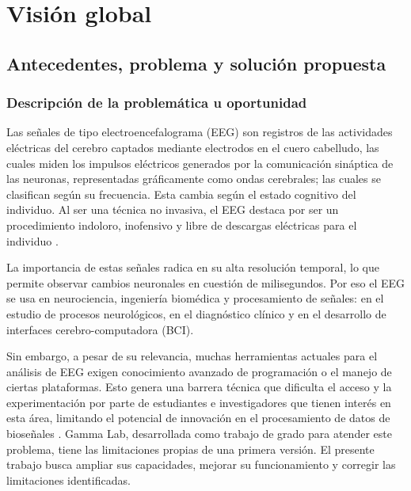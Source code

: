 \documentclass[12pt,letterpaper]{article}
\begin{document}
\newpage



\section{Visión global}

\subsection{Antecedentes, problema y solución propuesta}



\subsubsection{Descripción de la problemática u oportunidad}

Las señales de tipo electroencefalograma (EEG) son registros de las actividades eléctricas del cerebro captados mediante electrodos en el cuero cabelludo, las cuales miden los impulsos eléctricos generados por la comunicación sináptica de las neuronas, representadas gráficamente como ondas cerebrales; las cuales se clasifican según su frecuencia. Esta cambia según el estado cognitivo del individuo. Al ser una técnica no invasiva, el EEG destaca por ser un procedimiento indoloro, inofensivo y libre de descargas eléctricas para el individuo \cite{pira_eeg_2023}.

La importancia de estas señales radica en su alta resolución temporal, lo que permite observar cambios neuronales en cuestión de milisegundos. Por eso el EEG se usa en neurociencia, ingeniería biomédica y procesamiento de señales: en el estudio de procesos neurológicos, en el diagnóstico clínico y en el desarrollo de interfaces cerebro-computadora (BCI).

Sin embargo, a pesar de su relevancia, muchas herramientas actuales para el análisis de EEG exigen conocimiento avanzado de programación o el manejo de ciertas plataformas. Esto genera una barrera técnica que dificulta el acceso y la experimentación por parte de estudiantes e investigadores que tienen interés en esta área, limitando el potencial de innovación en el procesamiento de datos de bioseñales \cite{chaddad_electroencephalography_2023}. Gamma Lab, desarrollada como trabajo de grado para atender este problema, tiene las limitaciones propias de una primera versión. El presente trabajo busca ampliar sus capacidades, mejorar su funcionamiento y corregir las limitaciones identificadas.
\end{document}
